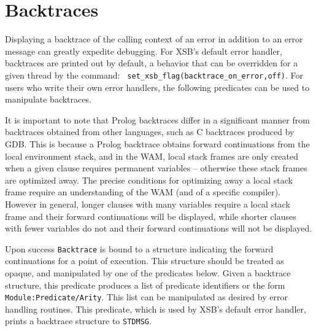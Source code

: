 \section{Backtraces}
\label{sec:backtrace}

Displaying a backtrace of the calling context of an error in addition
to an error message can greatly expedite debugging.  For XSB's default
error handler, backtraces are printed out by default, a behavior that
can be overridden for a given thread by the command: {\tt
  set\_xsb\_flag(backtrace\_on\_error,off)}.  For users who write
their own error handlers, the following predicates can be used to
manipulate backtraces.

It is important to note that Prolog backtraces differ in a significant
manner from backtraces obtained from other languages, such as C
backtraces produced by GDB.  This is because a Prolog backtrace
obtains forward continuations from the local environment stack, and in
the WAM, local stack frames are only created when a given clause
requires permanent variables -- otherwise these stack frames are
optimized away.  The precise conditions for optimizing away a local
stack frame require an understanding of the WAM (and of a specific
compiler).  However in general, longer clauses with many variables
require a local stack frame and their forward continuations will be
displayed, while shorter clauses with fewer variables do not and their
forward continuations will not be displayed.

\begin{description}
Upon success {\tt Backtrace} is bound to a structure indicating the
forward continuations for a point of execution.  This structure should
be treated as opaque, and manipulated by one of the predicates below.
%
Given a backtrace structure, this predicate produces a list of
predicate identifiers or the form {\tt Module:Predicate/Arity}.  This
list can be manipulated as desired by error handling routines.
%
 This predicate, which is used by XSB's default error handler, prints
 a backtrace structure to {\tt STDMSG}.
\end{description}
